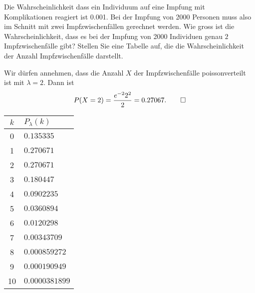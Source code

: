 Die Wahrscheinlichkeit dass ein Individuum auf eine Impfung
mit Komplikationen reagiert ist 0.001.
Bei der Impfung von 2000 Personen muss also im Schnitt
mit zwei Impfzwischenfällen gerechnet werden.
Wie gross ist die Wahrscheinlichkeit, dass es
bei der Impfung von 2000 Individuen genau $2$ Impfzwischenfälle
gibt? Stellen Sie eine Tabelle auf, die die Wahrscheinlichkeit
der Anzahl Impfzwischenfälle darstellt.


\begin{loesung}
Wir dürfen annehmen, dass die Anzahl $X$ der Impfzwischenfälle
poissonverteilt ist mit $\lambda=2$. Dann ist
\[
P(X=2)=\frac{e^{-2}2^2}2=0.27067.
\qedhere
\]
\begin{center}
\begin{tabular}{|c|l|}
\hline
$k$&$P_\lambda(k)$\\
\hline
0&$0.135335$\\
1&$0.270671$\\
2&$0.270671$\\
3&$0.180447$\\
4&$0.0902235$\\
5&$0.0360894$\\
6&$0.0120298$\\
7&$0.00343709$\\
8&$0.000859272$\\
9&$0.000190949$\\
10&$0.0000381899$\\
\hline
\end{tabular}
\end{center}
\end{loesung}
